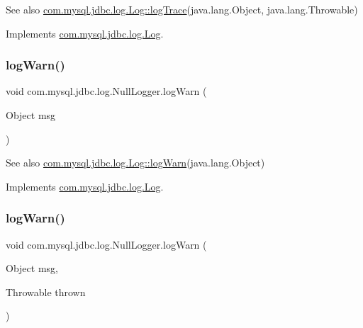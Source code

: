 \begin{DoxySeeAlso}{See also}
\mbox{\hyperlink{interfacecom_1_1mysql_1_1jdbc_1_1log_1_1_log_a8946382e4cf99819a43cdb3783fd0ee3}{com.\+mysql.\+jdbc.\+log.\+Log\+::log\+Trace}}(java.\+lang.\+Object, java.\+lang.\+Throwable) 
\end{DoxySeeAlso}


Implements \mbox{\hyperlink{interfacecom_1_1mysql_1_1jdbc_1_1log_1_1_log_a99ab17ccd9795acda736a284d9e32024}{com.\+mysql.\+jdbc.\+log.\+Log}}.

\mbox{\label{classcom_1_1mysql_1_1jdbc_1_1log_1_1_null_logger_a044427d312493d8d18be0033d2451d36}} 
\subsubsection{\texorpdfstring{log\+Warn()}{logWarn()}\hspace{0.1cm}{\footnotesize\ttfamily [1/2]}}
{\footnotesize\ttfamily void com.\+mysql.\+jdbc.\+log.\+Null\+Logger.\+log\+Warn (\begin{DoxyParamCaption}\item[{Object}]{msg }\end{DoxyParamCaption})}

\begin{DoxySeeAlso}{See also}
\mbox{\hyperlink{interfacecom_1_1mysql_1_1jdbc_1_1log_1_1_log_aa37a430b8cd7d66bb3ff46cb87e060f3}{com.\+mysql.\+jdbc.\+log.\+Log\+::log\+Warn}}(java.\+lang.\+Object) 
\end{DoxySeeAlso}


Implements \mbox{\hyperlink{interfacecom_1_1mysql_1_1jdbc_1_1log_1_1_log_aa37a430b8cd7d66bb3ff46cb87e060f3}{com.\+mysql.\+jdbc.\+log.\+Log}}.

\mbox{\label{classcom_1_1mysql_1_1jdbc_1_1log_1_1_null_logger_aa77c3a63e80bc15adc4c26d886e3d5f5}} 
\subsubsection{\texorpdfstring{log\+Warn()}{logWarn()}\hspace{0.1cm}{\footnotesize\ttfamily [2/2]}}
{\footnotesize\ttfamily void com.\+mysql.\+jdbc.\+log.\+Null\+Logger.\+log\+Warn (\begin{DoxyParamCaption}\item[{Object}]{msg,  }\item[{Throwable}]{thrown }\end{DoxyParamCaption})}

